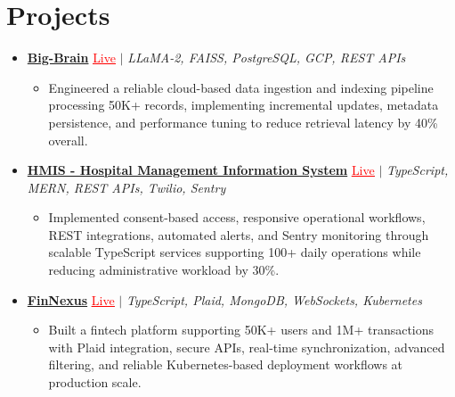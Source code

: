 \documentclass[letterpaper,10pt]{article}
\newcommand{\itemTail}{\vspace{-5pt}}
\newcommand{\projGap}{\vspace{3pt}}
\newcommand{\resumeItem}[1]{\item\small{{#1 \itemTail}}}
\newcommand{\resumeProjectHeading}[1]{\item \small #1 \vspace{-2pt}}
\newcommand{\resumeProjectLink}[2]{\href{#1}{\textcolor{red}{\underline{#2}}}}
\newcommand{\resumeSubHeadingListStart}{\begin{itemize}[leftmargin=0.0in, label={}]}
\newcommand{\resumeSubHeadingListEnd}{\end{itemize}}
\newcommand{\resumeProjItemListStart}{\begin{itemize}[leftmargin=0.15in,label=\textbullet,itemsep=3pt,topsep=0pt,parsep=0pt,partopsep=0pt]}
\newcommand{\resumeProjItemListEnd}{\end{itemize}\vspace{-4pt}}
\begin{document}
\section{Projects}
\resumeSubHeadingListStart
\vspace{-2pt}
\resumeProjectHeading{\href{https://big-brain-pied.vercel.app/}{\textbf{Big-Brain}} \resumeProjectLink{https://big-brain-pied.vercel.app/}{Live} $|$ \emph{LLaMA-2, FAISS, PostgreSQL, GCP, REST APIs}}
\resumeProjItemListStart
\resumeItem{Engineered a reliable cloud-based data ingestion and indexing pipeline processing 50K+ records, implementing incremental updates, metadata persistence, and performance tuning to reduce retrieval latency by 40\% overall.}
\resumeProjItemListEnd
\projGap
\resumeProjectHeading{\href{https://hims-rouge.vercel.app/}{\textbf{HMIS - Hospital Management Information System}} \resumeProjectLink{https://hims-rouge.vercel.app/}{Live} $|$ \emph{TypeScript, MERN, REST APIs, Twilio, Sentry}}
\resumeProjItemListStart
\resumeItem{Implemented consent-based access, responsive operational workflows, REST integrations, automated alerts, and Sentry monitoring through scalable TypeScript services supporting 100+ daily operations while reducing administrative workload by 30\%.}
\resumeProjItemListEnd
\projGap
\resumeProjectHeading{\href{https://fin-nexus.vercel.app/}{\textbf{FinNexus}} \resumeProjectLink{https://fin-nexus.vercel.app/}{Live} $|$ \emph{TypeScript, Plaid, MongoDB, WebSockets, Kubernetes}}
\resumeProjItemListStart
\resumeItem{Built a fintech platform supporting 50K+ users and 1M+ transactions with Plaid integration, secure APIs, real-time synchronization, advanced filtering, and reliable Kubernetes-based deployment workflows at production scale.}
\resumeProjItemListEnd
\resumeSubHeadingListEnd
\end{document}
